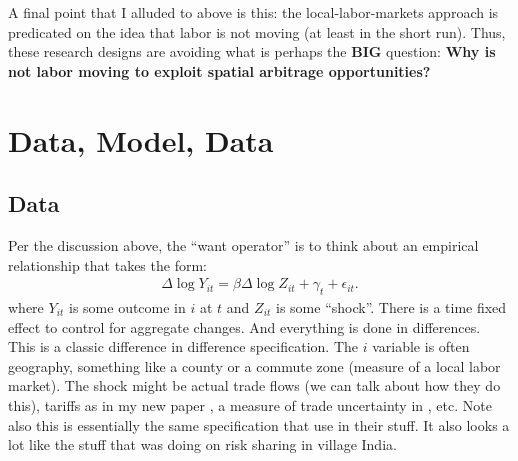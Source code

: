 \documentclass[pdftex,12pt]{article}
\begin{document}
\medskip
\noindent A final point that I alluded to above is this: the local-labor-markets approach is predicated on the idea that labor is not moving (at least in the short run). Thus, these research designs are avoiding what is perhaps the \textbf{BIG} question: \textbf{Why is not labor moving to exploit spatial arbitrage opportunities?} 

\section{Data, Model, Data}

\subsection{Data}

Per the discussion above, the ``want operator'' is to think about an empirical relationship that takes the form:
\begin{align}
\Delta \log Y_{it} = \beta \Delta \log Z_{it} + \gamma_t + \epsilon_{it}.
\label{eq:adh_data_specification}
\end{align}
where $Y_{it}$ is some outcome in $i$ at $t$ and $Z_{it}$ is some ``shock''. There is a time fixed effect to control for aggregate changes. And everything is done in differences. This is a classic difference in difference specification. The $i$ variable is often geography, something like a county or a commute zone (measure of a local labor market). The shock might be actual trade flows (we can talk about how they do this), tariffs as in my new paper \citet{waugh_consumption}, a measure of trade uncertainty in \citet{pierce2016surprisingly}, etc. Note also this is essentially the same specification that \citet{mian2013household} use in their stuff. It also looks a lot like the stuff that \citet{townsend1994risk} was doing on risk sharing in village India.
\end{document}
